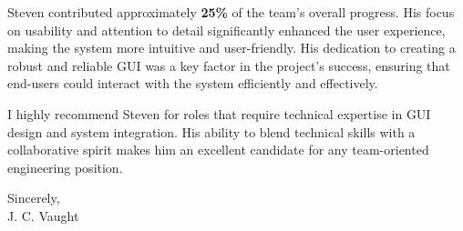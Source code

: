 \documentclass[11pt]{article}
\begin{document}
\begin{flushleft}
Steven contributed approximately \textbf{25\%} of the team’s overall progress. His focus on usability and attention to detail significantly enhanced the user experience, making the system more intuitive and user-friendly. His dedication to creating a robust and reliable GUI was a key factor in the project's success, ensuring that end-users could interact with the system efficiently and effectively.

I highly recommend Steven for roles that require technical expertise in GUI design and system integration. His ability to blend technical skills with a collaborative spirit makes him an excellent candidate for any team-oriented engineering position.

\vspace{12pt}

Sincerely, \\
J. C. Vaught

\end{flushleft}

\newpage
\end{document}
